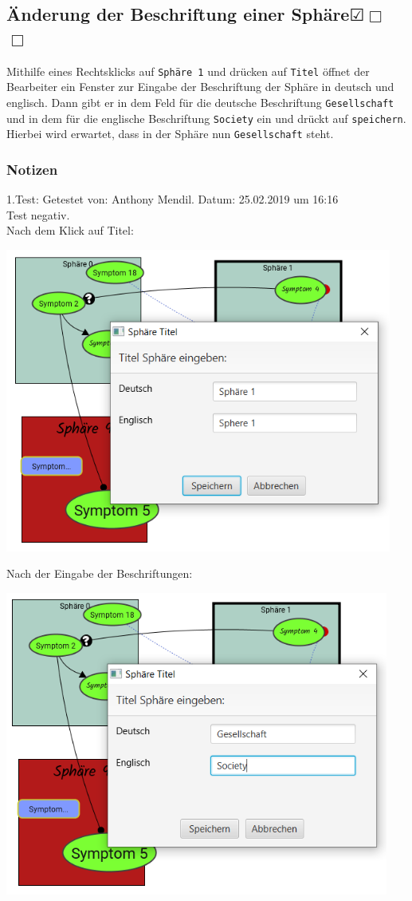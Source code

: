 \documentclass{scrartcl}
\newcommand{\subsectiont}[2]{\subsection[#1]{#1{\normalsize\normalfont #2}}}
\newcommand{\leer}{$\Box$}
\newcommand{\ok}{$\CheckedBox$}
\begin{document}
\subsectiont{Änderung der Beschriftung einer Sphäre}{\dotfill\ok\leer\leer}
Mithilfe eines Rechtsklicks auf \texttt{Sphäre 1} und drücken auf \texttt{Titel} öffnet der Bearbeiter ein Fenster zur Eingabe der Beschriftung der Sphäre in deutsch und englisch. Dann gibt er in dem Feld für die deutsche Beschriftung \texttt{Gesellschaft}  und in dem für die englische Beschriftung \texttt{Society} ein und drückt auf \texttt{speichern}. Hierbei wird erwartet, dass in der Sphäre nun \texttt{Gesellschaft} steht. 
\subsubsection{Notizen}
1.Test: Getestet von: Anthony Mendil. Datum: 25.02.2019 um 16:16 \\
Test negativ. \\
Nach dem Klick auf Titel: 
\begin{center}
\includegraphics[height=10cm]{3_49oeffnen.PNG}
\end{center}
Nach der Eingabe der Beschriftungen:
\begin{center}
\includegraphics[height=10cm]{3_49eingabe.PNG}
\end{center}
\end{document}
